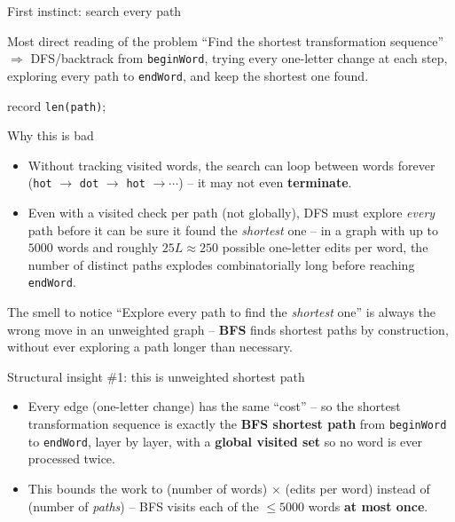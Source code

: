 \documentclass[11pt,aspectratio=169]{beamer}
\begin{document}
\begin{frame}{First instinct: search every path}
  \begin{block}{Most direct reading of the problem}
    ``Find the shortest transformation sequence'' $\Rightarrow$ DFS/backtrack from
    \texttt{beginWord}, trying every one-letter change at each step, exploring every
    path to \texttt{endWord}, and keep the shortest one found.
  \end{block}
  \begin{algorithmic}[1]
       record \texttt{len(path)}; \Return \EndIf
        \State {} 
      \EndFor
    \EndFunction
  \end{algorithmic}
\end{frame}

\begin{frame}{Why this is bad}
  \begin{itemize}
    \item Without tracking visited words, the search can loop between words forever
    (\texttt{hot} $\to$ \texttt{dot} $\to$ \texttt{hot} $\to \cdots$) -- it may not even
    \textbf{terminate}.
    \item Even with a visited check per path (not globally), DFS must explore
    \emph{every} path before it can be sure it found the \emph{shortest} one -- in a
    graph with up to $5000$ words and roughly $25L\!\approx\!250$ possible one-letter
    edits per word, the number of distinct paths explodes combinatorially long before
    reaching \texttt{endWord}.
  \end{itemize}
  \begin{alertblock}{The smell to notice}
    ``Explore every path to find the \emph{shortest} one'' is always the wrong move in
    an unweighted graph -- \textbf{BFS} finds shortest paths by construction, without
    ever exploring a path longer than necessary.
  \end{alertblock}
\end{frame}

\begin{frame}{Structural insight \#1: this is unweighted shortest path}
  \begin{itemize}
    \item Every edge (one-letter change) has the same ``cost'' -- so the shortest
    transformation sequence is exactly the \textbf{BFS shortest path} from
    \texttt{beginWord} to \texttt{endWord}, layer by layer, with a \textbf{global
    visited set} so no word is ever processed twice.
    \item This bounds the work to (number of words) $\times$ (edits per word) instead of
    (number of \emph{paths}) -- BFS visits each of the $\le 5000$ words \textbf{at most
    once}.
  \end{itemize}
\end{frame}
\end{document}
